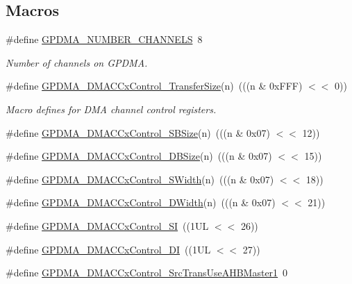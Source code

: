 \subsection*{Macros}
\begin{DoxyCompactItemize}
\item 
\#define \hyperlink{group__GPDMA__17XX__40XX_gaf7c43b3d13c91c30ddf67e479966d5cd}{G\-P\-D\-M\-A\-\_\-\-N\-U\-M\-B\-E\-R\-\_\-\-C\-H\-A\-N\-N\-E\-L\-S}~8
\begin{DoxyCompactList}\small\item\em Number of channels on G\-P\-D\-M\-A. \end{DoxyCompactList}\item 
\#define \hyperlink{group__GPDMA__17XX__40XX_ga0e3ee35f724f4ef0cc8e91dfaec761e4}{G\-P\-D\-M\-A\-\_\-\-D\-M\-A\-C\-Cx\-Control\-\_\-\-Transfer\-Size}(n)~(((n \& 0x\-F\-F\-F) $<$$<$ 0))
\begin{DoxyCompactList}\small\item\em Macro defines for D\-M\-A channel control registers. \end{DoxyCompactList}\item 
\#define \hyperlink{group__GPDMA__17XX__40XX_ga1f5c9d534965c6a89ea22ca3fa48d859}{G\-P\-D\-M\-A\-\_\-\-D\-M\-A\-C\-Cx\-Control\-\_\-\-S\-B\-Size}(n)~(((n \& 0x07) $<$$<$ 12))
\item 
\#define \hyperlink{group__GPDMA__17XX__40XX_ga18c40b7931f0b6cfe8b81f9a982c0641}{G\-P\-D\-M\-A\-\_\-\-D\-M\-A\-C\-Cx\-Control\-\_\-\-D\-B\-Size}(n)~(((n \& 0x07) $<$$<$ 15))
\item 
\#define \hyperlink{group__GPDMA__17XX__40XX_ga2ee63289c5e248a07ea901e233e1dd00}{G\-P\-D\-M\-A\-\_\-\-D\-M\-A\-C\-Cx\-Control\-\_\-\-S\-Width}(n)~(((n \& 0x07) $<$$<$ 18))
\item 
\#define \hyperlink{group__GPDMA__17XX__40XX_ga67bb6ed286afe6d4091c0fcd8799b451}{G\-P\-D\-M\-A\-\_\-\-D\-M\-A\-C\-Cx\-Control\-\_\-\-D\-Width}(n)~(((n \& 0x07) $<$$<$ 21))
\item 
\#define \hyperlink{group__GPDMA__17XX__40XX_gaa9b006e86536835dfe6f7034ee25d12a}{G\-P\-D\-M\-A\-\_\-\-D\-M\-A\-C\-Cx\-Control\-\_\-\-S\-I}~((1\-U\-L $<$$<$ 26))
\item 
\#define \hyperlink{group__GPDMA__17XX__40XX_gaddcec41c911bbd0911391e6195c1c040}{G\-P\-D\-M\-A\-\_\-\-D\-M\-A\-C\-Cx\-Control\-\_\-\-D\-I}~((1\-U\-L $<$$<$ 27))
\item 
\#define \hyperlink{group__GPDMA__17XX__40XX_ga90b29a1b2c82b32d6e586d74cdd727b7}{G\-P\-D\-M\-A\-\_\-\-D\-M\-A\-C\-Cx\-Control\-\_\-\-Src\-Trans\-Use\-A\-H\-B\-Master1}~0
$$
\end{DoxyCompactItemize}
